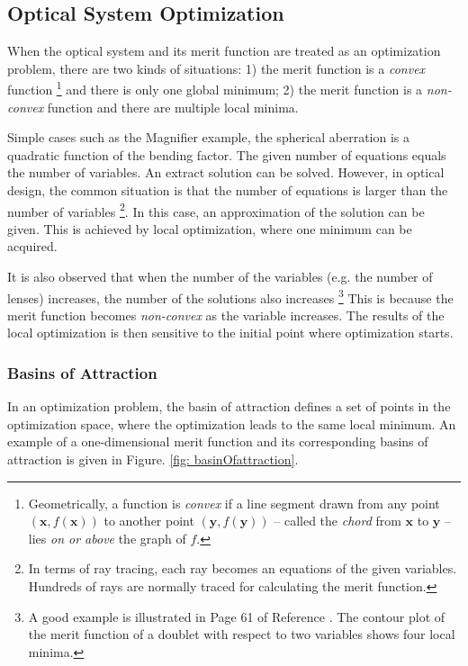 \subsection{Optical System Optimization }
\vspace{1em}
When the optical system and its merit function are treated as an optimization problem, there are two kinds of situations: 1) the merit function is a \textit{convex} function \footnote{Geometrically, a function is \textit{convex} if a line segment drawn from any point $(\pmb{x}, f(\pmb{x}))$ to another point $(\pmb{y}, f(\pmb{y}))$ -- called the \textit{chord} from $\pmb{x}$ to $\pmb{y}$ -- lies \textit{on or above} the graph of $f$.} and there is only one global minimum; 2) the merit function is a \textit{non-convex} function and there are multiple local minima. 

Simple cases such as the Magnifier example, the spherical aberration is a quadratic function of the bending factor.  The given number of equations equals the number of variables. An extract solution can be solved. However, in optical design, the common situation is that the number of equations is larger than the number of variables \footnote{In terms of ray tracing, each ray becomes an equations of the given variables. Hundreds of rays are normally traced for calculating the merit function.}. In this case, an approximation of the solution can be given. This is achieved by local optimization, where one minimum can be acquired. 

It is also observed that when the number of the variables (e.g. the number of lenses) increases, the number of the solutions also increases \footnote{A good example is illustrated in Page 61 of Reference \cite{vanTurnhoutThesis2009}. The contour plot of the merit function of a doublet with respect to two variables shows four local minima.} This is because the merit function becomes \textit{non-convex} as the variable increases. The results of the local optimization is then sensitive to the initial point where optimization starts.  

\subsubsection{Basins of Attraction \label{label: basinOfattrac}}
\vspace{1em}
In an optimization problem, the basin of attraction defines a set of points in the optimization space, where the optimization leads to the same local minimum. An example of a one-dimensional merit function and its corresponding basins of attraction is given in Figure. \ref{fig: basinOfattraction}. 

